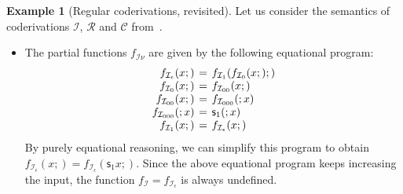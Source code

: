 \documentclass[manuscript,screen]{acmart}
\theoremstyle{definition}
\newtheorem{exmp}[thm]{Example}
\theoremstyle{remark}
\renewcommand{\succ}[1]{\mathsf{s}_{#1}}
\newcommand{\denot}[1]{f_{#1}}
\newcommand{\cconc}{\mathcal{C}}
\newcommand{\incrementation}{\mathcal{I}}
\newcommand{\successor}{\mathcal{S}}
\newcommand{\primrec}{\mathcal{R}}
\begin{document}
\begin{exmp}[Regular coderivations, revisited] Let us consider the semantics of coderivations $\incrementation$, $\primrec$ and $\cconc$ from~.  
\begin{itemize}
    \item The  partial functions $\denot{\incrementation \nu}$  are given by the following equational program:
\[
 \arraycolsep=2pt
\begin{array}{rcll}
    \denot{\incrementation_{\epsilon}}  (x;) & = & \denot{\incrementation_{1}}(\denot{\incrementation_{0}}(x;);) \\
   \denot{\incrementation_{0}}(x;) & = & \denot{\incrementation_{00}}(x;)\\
   \denot{\incrementation_{00}}(x;) & = & \denot{\incrementation_{000}}(;x)\\
   \denot{\incrementation_{000}}(;x) & = & \succ 1(;x)\\
   \denot{\incrementation_{1}}(x;) & = & \denot{\incrementation_{\epsilon}}(x;)
\end{array}
\]
By purely equational reasoning, we can simplify this program to obtain $\denot{\incrementation_{\epsilon}}(x;)  =  \denot{\incrementation_{\epsilon}}(\succ 1x;)$. 
 Since the above equational program keeps increasing the input, the function $\denot\incrementation=\denot{\incrementation_{\epsilon}}$ is always undefined. 

\end{itemize}
\end{exmp}
\end{document}

